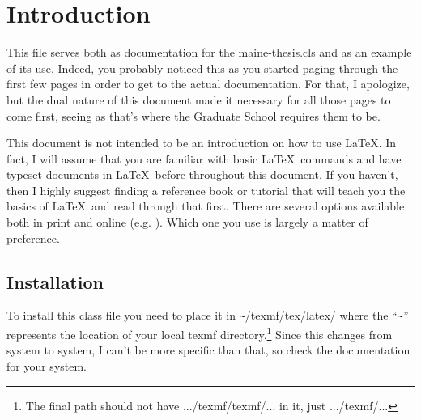 \chapter{Introduction}
This file serves both as documentation for the maine-thesis.cls and as an example of its use.  Indeed, you probably noticed this as you started paging through the first few pages in order to get to the actual documentation.  For that, I apologize, but the dual nature of this document made it necessary for all those pages to come first, seeing as that's where the Graduate School requires them to be.

This document is not intended to be an introduction on how to use \LaTeX. In fact, I will assume that you are familiar with basic \LaTeX\ commands and have typeset documents in \LaTeX\ before throughout this document.  If you haven't, then I highly suggest finding a reference book or tutorial that will teach you the basics of \LaTeX\ and read through that first.  There are several options available both in print and online (e.g. \cite{Kopka:2004,Mittelbach:2004,Flynn:2005}).  Which one you use is largely a matter of preference.

\section{Installation}
To install this class file you need to place it in \verb=~=/texmf/tex/latex/ where the ``\verb=~='' represents the location of your local texmf directory.\footnote{The final path should not have .../texmf/texmf/... in it, just .../texmf/...}  Since this changes from system to system, I can't be more specific than that, so check the documentation for your system.

